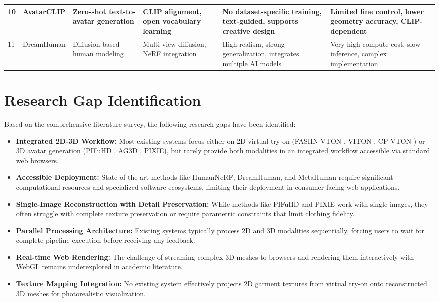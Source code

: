 \documentclass[12pt,a4paper,oneside]{report}
\begin{document}
\begin{center}
\begin{longtable}{|p{0.1cm}|p{1.9cm}|p{2.0cm}|p{2.0cm}|p{2.0cm}|p{2.0cm}|}
\hline
10 & AvatarCLIP & Zero-shot text-to-avatar generation & CLIP alignment, open vocabulary learning & No dataset-specific training, text-guided, supports creative design & Limited fine control, lower geometry accuracy, CLIP-dependent \\
\hline
11 & DreamHuman & Diffusion-based human modeling & Multi-view diffusion, NeRF integration & High realism, strong generalization, integrates multiple AI models & Very high compute cost, slow inference, complex implementation \\
\hline
\end{longtable}
\end{center}

\section{Research Gap Identification}

Based on the comprehensive literature survey, the following research gaps have been identified:

\begin{itemize}
    \item \textbf{Integrated 2D-3D Workflow:} Most existing systems focus either on 2D virtual try-on (FASHN-VTON \cite{16}, VITON \cite{17}, CP-VTON \cite{18}) or 3D avatar generation (PIFuHD \cite{1}, AG3D \cite{3}, PIXIE), but rarely provide both modalities in an integrated workflow accessible via standard web browsers.

    \item \textbf{Accessible Deployment:} State-of-the-art methods like HumanNeRF, DreamHuman, and MetaHuman require significant computational resources and specialized software ecosystems, limiting their deployment in consumer-facing web applications.

    \item \textbf{Single-Image Reconstruction with Detail Preservation:} While methods like PIFuHD \cite{1} and PIXIE work with single images, they often struggle with complete texture preservation or require parametric constraints \cite{2} that limit clothing fidelity.

    \item \textbf{Parallel Processing Architecture:} Existing systems typically process 2D and 3D modalities sequentially, forcing users to wait for complete pipeline execution before receiving any feedback.

    \item \textbf{Real-time Web Rendering:} The challenge of streaming complex 3D meshes to browsers and rendering them interactively with WebGL \cite{6} remains underexplored in academic literature.

    \item \textbf{Texture Mapping Integration:} No existing system effectively projects 2D garment textures from virtual try-on onto reconstructed 3D meshes for photorealistic visualization.
\end{itemize}
\end{document}
